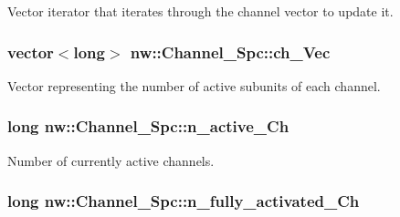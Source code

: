 Vector iterator that iterates through the channel vector to update it. 

\hypertarget{classnw_1_1_channel___spc_aca3ddf4eba759eeeb835bba168795a11}{
\subsubsection[{ch\+\_\+\+Vec}]{\setlength{\rightskip}{0pt plus 5cm}vector$<$long$>$ nw\+::\+Channel\+\_\+\+Spc\+::ch\+\_\+\+Vec\hspace{0.3cm}{\ttfamily [private]}}}\label{classnw_1_1_channel___spc_aca3ddf4eba759eeeb835bba168795a11}


Vector representing the number of active subunits of each channel. 

\hypertarget{classnw_1_1_channel___spc_a67fd1b83563c30ec86802bdab420c95d}{
\subsubsection[{n\+\_\+active\+\_\+\+Ch}]{\setlength{\rightskip}{0pt plus 5cm}long nw\+::\+Channel\+\_\+\+Spc\+::n\+\_\+active\+\_\+\+Ch\hspace{0.3cm}{\ttfamily [private]}}}\label{classnw_1_1_channel___spc_a67fd1b83563c30ec86802bdab420c95d}


Number of currently active channels. 

\hypertarget{classnw_1_1_channel___spc_ac6ae04b799c751bb61918b4ab163ce85}{
\subsubsection[{n\+\_\+fully\+\_\+activated\+\_\+\+Ch}]{\setlength{\rightskip}{0pt plus 5cm}long nw\+::\+Channel\+\_\+\+Spc\+::n\+\_\+fully\+\_\+activated\+\_\+\+Ch\hspace{0.3cm}{\ttfamily [private]}}}\label{classnw_1_1_channel___spc_ac6ae04b799c751bb61918b4ab163ce85}


